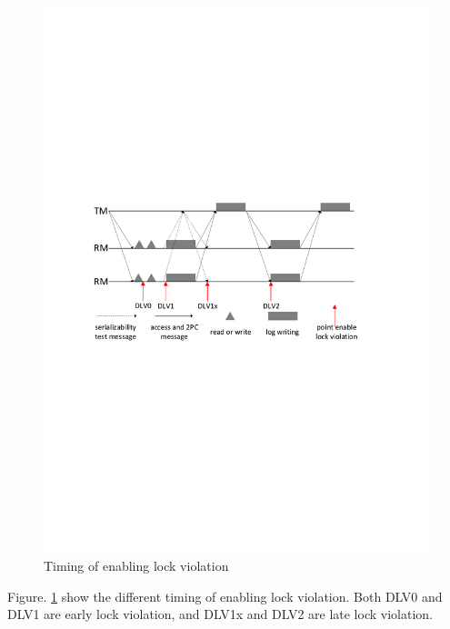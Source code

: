 \documentclass[conference]{IEEEtran}
\begin{document}
\begin{figure}[tbp]
  \centerline{\includegraphics[scale=0.50]{figure/lock_violation_time.pdf}}
  \caption
  {Timing of enabling lock violation}
\label{fig:lock_violation_time}
\end{figure}

Figure. \ref{fig:lock_violation_time} show the different timing of enabling lock violation.
Both DLV0 and DLV1 are early lock violation, and DLV1x and DLV2 are late lock violation.
\end{document}
